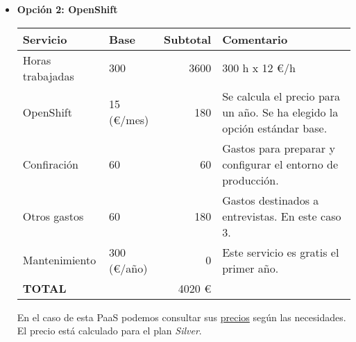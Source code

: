 \begin{itemize}
\item \textbf{Opción 2: OpenShift}
\begin{center}
    \begin{tabular}{| l | l | r | p{5cm} |}
    \hline
    Servicio & Base & Subtotal & Comentario \\ \hline
    Horas trabajadas & 300 & 3600 & 300 h x 12 \euro/h \\ \hline
    OpenShift & 15 (\euro/mes) & 180 & Se calcula el precio para un año. Se ha elegido la opción estándar base.\\ \hline
    Confiración & 60 & 60 & Gastos para preparar y configurar el entorno de producción. \\ \hline 
    Otros gastos & 60 & 180 & Gastos destinados a entrevistas. En este caso 3. \\ \hline 
    Mantenimiento & 300 (\euro/año) & 0 & Este servicio es gratis el primer año. \\ \hline
    \textbf{TOTAL} &  & 4020 \euro & \\
    \hline
    \end{tabular}
\end{center}

En el caso de esta PaaS podemos consultar sus \href{https://www.openshift.com/products/pricing/plan-comparison}{precios} según las necesidades. El precio está calculado para el plan \emph{Silver}.

\end{itemize}

